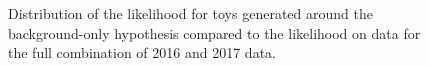 \begin{figure}[h!]
\centering
{}
\caption{Distribution of the likelihood for toys generated around the background-only hypothesis compared to the likelihood on data for the full combination of 2016 and 2017 data.}
\label{fig:gofSR}
\end{figure}

